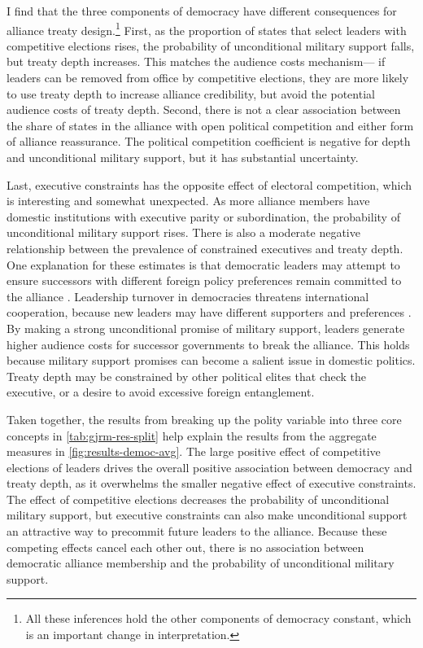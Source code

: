 \documentclass[12pt]{article}
\begin{document}
I find that the three components of democracy have different consequences for alliance treaty design.\footnote{All these inferences hold the other components of democracy constant, which is an important change in interpretation.}
First, as the proportion of states that select leaders with competitive elections rises, the probability of unconditional military support falls, but treaty depth increases.
This matches the audience costs mechanism--- if leaders can be removed from office by competitive elections, they are more likely to use treaty depth to increase alliance credibility, but avoid the potential audience costs of treaty depth. 
Second, there is not a clear association between the share of states in the alliance with open political competition and either form of alliance reassurance.
The political competition coefficient is negative for depth and unconditional military support, but it has substantial uncertainty.


Last, executive constraints has the opposite effect of electoral competition, which is interesting and somewhat unexpected. 
As more alliance members have domestic institutions with executive parity or subordination, the probability of unconditional military support rises. 
There is also a moderate negative relationship between the prevalence of constrained executives and treaty depth.  
One explanation for these estimates is that democratic leaders may attempt to ensure successors with different foreign policy preferences remain committed to the alliance \cite{Mattes2012a}. 
Leadership turnover in democracies threatens international cooperation, because new leaders may have different supporters and preferences \citep{Lobell2004, Narizny2007, Leedsetal2009}. 
By making a strong unconditional promise of military support, leaders generate higher audience costs for successor governments to break the alliance. 
This holds because military support promises can become a salient issue in domestic politics. 
Treaty depth may be constrained by other political elites that check the executive, or a desire to avoid excessive foreign entanglement.  


Taken together, the results from breaking up the polity variable into three core concepts in \autoref{tab:gjrm-res-split} help explain the results from the aggregate measures in \autoref{fig:results-democ-avg}. 
The large positive effect of competitive elections of leaders drives the overall positive association between democracy and treaty depth, as it overwhelms the smaller negative effect of executive constraints. 
The effect of competitive elections decreases the probability of unconditional military support, but executive constraints can also make unconditional support an attractive way to precommit future leaders to the alliance. 
Because these competing effects cancel each other out, there is no association between democratic alliance membership and the probability of unconditional military support. 
\end{document}

